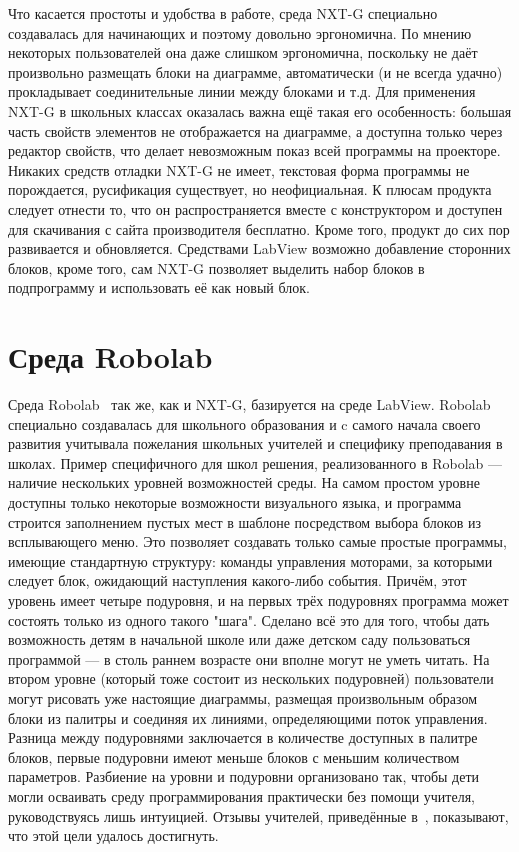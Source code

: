 \documentclass[a4paper]{article}
\begin{document}
Что касается простоты и удобства в работе, среда NXT-G специально создавалась для начинающих и поэтому довольно эргономична. По мнению некоторых пользователей она даже слишком эргономична, поскольку не даёт произвольно размещать блоки на диаграмме, автоматически (и не всегда удачно) прокладывает соединительные линии между блоками и т.д. Для применения NXT-G в школьных классах оказалась важна ещё такая его особенность: большая часть свойств элементов не отображается на диаграмме, а доступна только через редактор свойств, что делает невозможным показ всей программы на проекторе. Никаких средств отладки NXT-G не имеет, текстовая форма программы не порождается, русификация существует, но неофициальная. К плюсам продукта следует отнести то, что он распространяется вместе с конструктором и доступен для скачивания с сайта производителя бесплатно. Кроме того, продукт до сих пор развивается и обновляется. Средствами LabView возможно добавление сторонних блоков, кроме того, сам NXT-G позволяет выделить набор блоков в подпрограмму и использовать её как новый блок.

\section{Среда Robolab}
Среда Robolab~\cite{robolab} так же, как и NXT-G, базируется на среде LabView. Robolab специально создавалась для школьного образования и c самого начала своего развития учитывала пожелания школьных учителей и специфику преподавания в школах. Пример специфичного для школ решения, реализованного в Robolab --- наличие нескольких уровней возможностей среды. На самом простом уровне доступны только некоторые возможности визуального языка, и программа строится заполнением пустых мест в шаблоне посредством выбора блоков из всплывающего меню. Это позволяет создавать только самые простые программы, имеющие стандартную структуру: команды управления моторами, за которыми следует блок, ожидающий наступления какого-либо события. Причём, этот уровень имеет четыре подуровня, и на первых трёх подуровнях программа может состоять только из одного такого "шага". Сделано всё это для того, чтобы дать возможность детям в начальной школе или даже детском саду пользоваться программой --- в столь раннем возрасте они вполне могут не уметь читать. На втором уровне (который тоже состоит из нескольких подуровней) пользователи могут рисовать уже настоящие диаграммы, размещая произвольным образом блоки из палитры и соединяя их линиями, определяющими поток управления. Разница между подуровнями заключается в количестве доступных в палитре блоков, первые подуровни имеют меньше блоков с меньшим количеством параметров. Разбиение на уровни и подуровни организовано так, чтобы дети могли осваивать среду программирования практически без помощи учителя, руководствуясь лишь интуицией. Отзывы учителей, приведённые в~\cite{robolab}, показывают, что этой цели удалось достигнуть.
\end{document}
